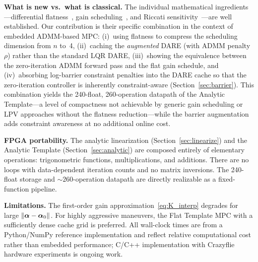 \textbf{What is new vs.\ what is classical.}
The individual mathematical ingredients---differential
flatness~\cite{fliess1995,mellinger2011},
gain scheduling~\cite{rugh2000},
and Riccati sensitivity~\cite{hewer1971,konstantinov1993}---are
well established.
Our contribution is their specific combination in the context
of embedded ADMM-based MPC:
(i)~using flatness to compress the scheduling dimension from
$n$ to~4,
(ii)~caching the \emph{augmented} DARE (with ADMM penalty $\rho$)
rather than the standard LQR DARE,
(iii)~showing the equivalence between the zero-iteration ADMM
forward pass and the flat gain schedule,
and (iv)~absorbing log-barrier constraint penalties into the DARE
cache so that the zero-iteration controller is inherently
constraint-aware (Section~\ref{sec:barrier}).
This combination yields the 240-float, 260-operation
datapath of the Analytic Template---a level of compactness
not achievable by generic gain scheduling or LPV approaches
without the flatness reduction---while the barrier augmentation
adds constraint awareness at no additional online cost.

\textbf{FPGA portability.}
The analytic linearization (Section~\ref{sec:linearize}) and the
Analytic Template (Section~\ref{sec:analytic}) are composed entirely
of elementary operations: trigonometric functions, multiplications,
and additions.
There are no loops with data-dependent iteration counts
and no matrix inversions.
The 240-float storage and ${\sim}260$-operation datapath
are directly realizable as a fixed-function pipeline.

\textbf{Limitations.}
The first-order gain approximation~\eqref{eq:K_interp} degrades
for large $\|\bm{\alpha} - \bm{\alpha}_0\|$.
For highly aggressive maneuvers, the Flat Template MPC with a
sufficiently dense cache grid is preferred.
All wall-clock times are from a Python/NumPy reference
implementation and reflect relative computational cost
rather than embedded performance;
C/C++ implementation with Crazyflie hardware experiments
is ongoing work.
